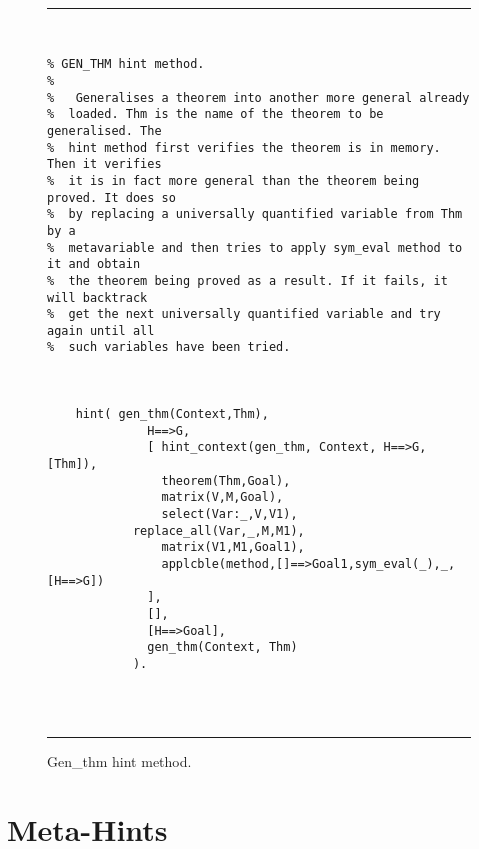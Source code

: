 \begin{figure}[htb] \begin{center} %
\hrule
\begin{small} 
\begin{verbatim} 


% GEN_THM hint method. 
%
%	Generalises a theorem into another more general already
%  loaded. Thm is the name of the theorem to be generalised. The
%  hint method first verifies the theorem is in memory. Then it verifies
%  it is in fact more general than the theorem being proved. It does so
%  by replacing a universally quantified variable from Thm by a
%  metavariable and then tries to apply sym_eval method to it and obtain
%  the theorem being proved as a result. If it fails, it will backtrack 
%  get the next universally quantified variable and try again until all
%  such variables have been tried.



	hint( gen_thm(Context,Thm),
              H==>G,
              [ hint_context(gen_thm, Context, H==>G, [Thm]),
                theorem(Thm,Goal),
                matrix(V,M,Goal),
                select(Var:_,V,V1),
	        replace_all(Var,_,M,M1),
                matrix(V1,M1,Goal1),
                applcble(method,[]==>Goal1,sym_eval(_),_,[H==>G])
              ],
              [],
              [H==>Goal],
              gen_thm(Context, Thm)
            ).




\end{verbatim}
\end{small}
\end{center}
\caption{Gen\_thm hint method.}
\label{gen-thm}
\hrule
\end{figure}

\clearpage
\clearpage
\clearpage
\clearpage

\section{Meta-Hints}



